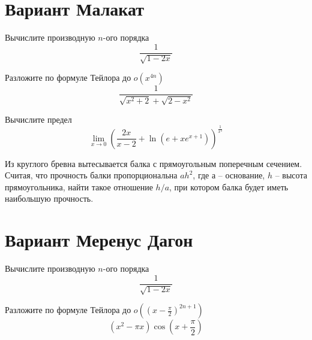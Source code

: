 \documentclass[russian]{article}
\begin{document}
\vspace{1cm}
\begin{center}
\end{center}
\newpage

\section*{Вариант Малакат}

Вычислите производную $n$-ого порядка
$$\frac{1}{\sqrt{1 - 2x}}$$

Разложите по формуле Тейлора до $o(x^{4n})$
$$\frac{1}{\sqrt{x^2 + 2} + \sqrt{2 - x^2}}$$

Вычислите предел
$$\lim_{x \to 0} \left(\frac{2x}{x - 2} + \ln(e + xe^{x + 1})\right)^{\frac{1}{x^3}}$$

Из круглого бревна вытесывается балка с прямоугольным поперечным сечением. Считая, что прочность балки пропорциональна $ah^2$, где $а$ -- основание, $h$ -- высота прямоугольника, найти такое отношение $h/a$, при котором балка будет иметь наибольшую прочность.

\vspace{1cm}
\begin{center}
\end{center}
\newpage

\section*{Вариант Меренус Дагон}

Вычислите производную $n$-ого порядка
$$\frac{1}{\sqrt{1 - 2x}}$$

Разложите по формуле Тейлора до $o((x - \frac{\pi}{2})^{2n + 1})$
$$(x^2 - \pi x) \cos\left(x + \frac{\pi}{2}\right)$$
\end{document}
